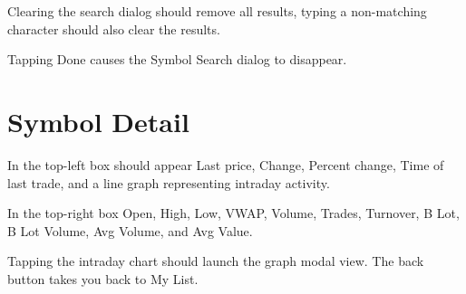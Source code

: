 \documentclass[12pt,twoside,letterpaper]{report}
\begin{document}
Clearing the search dialog should remove all results, typing a non-matching character should also clear the results.

Tapping Done causes the Symbol Search dialog to disappear.

\section*{Symbol Detail}

In the top-left box should appear Last price, Change, Percent change, Time of last trade, and a line graph representing intraday activity.

In the top-right box Open, High, Low, VWAP, Volume, Trades, Turnover, B Lot, B Lot Volume, Avg Volume, and Avg Value.

Tapping the intraday chart should launch the graph modal view. The back button takes you back to My List.
\end{document}
